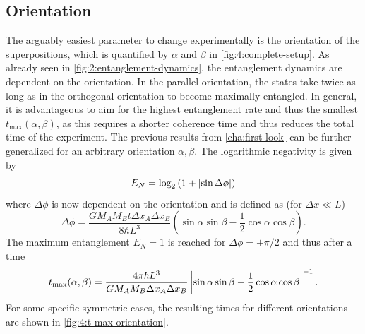 \subsection{Orientation}
The arguably easiest parameter to change experimentally is the orientation of the superpositions, which is quantified by $\alpha$ and $\beta$ in \cref{fig:4:complete-setup}.
As already seen in \cref{fig:2:entanglement-dynamics}, the entanglement dynamics are dependent on the orientation.
In the parallel orientation, the states take twice as long as in the orthogonal orientation to become maximally entangled.
In general, it is advantageous to aim for the highest entanglement rate and thus the smallest $t_\mathrm{max}(\alpha, \beta)$, as this requires a shorter coherence time and thus reduces the total time of the experiment.
The previous results from \cref{cha:first-look} can be further generalized for an arbitrary orientation $\alpha, \beta$. The logarithmic negativity is given by
\begin{equation}
  E_N = \log_2\left(1+\left\lvert\sin\Delta\phi\right\rvert\right)
\end{equation}
where $\Delta\phi$ is now dependent on the orientation and is defined as (for $\Delta x \ll L$)
\begin{equation}\label{eq:4:delta-phi}
  \Delta \phi = \frac{G M_A M_B t \Delta x_A \Delta x_B}{8\hbar L^3} \left(\sin\alpha\sin\beta-\frac{1}{2}\cos\alpha\cos\beta\right) .
\end{equation}
The maximum entanglement $E_N=1$ is reached for $\Delta\phi = \pm \pi/2$ and thus after a time
\begin{equation}\label{eq:4:t-max}
  t_\mathrm{max}(\alpha,\beta) = \frac{4\pi \hbar L^3}{G M_A M_B \Delta x_A \Delta x_B}\left\lvert\sin\alpha\sin\beta - \frac{1}{2}\cos\alpha\cos\beta\right\rvert^{-1}.
\end{equation}
For some specific symmetric cases, the resulting times for different orientations are shown in \cref{fig:4:t-max-orientation}.
